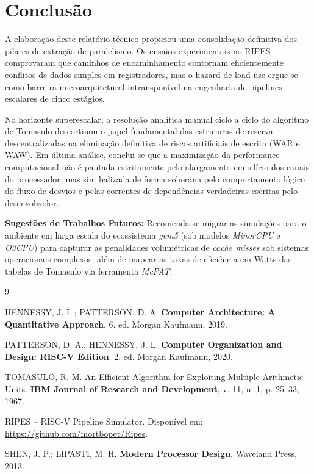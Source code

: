 \documentclass[12pt,a4paper]{article}
\begin{document}
\newpage

\section{Conclusão}
\label{sec:conclusao}

A elaboração deste relatório técnico propiciou uma consolidação definitiva dos pilares de extração de paralelismo. Os ensaios experimentais no RIPES comprovaram que caminhos de encaminhamento contornam eficientemente conflitos de dados simples em registradores, mas o hazard de load-use ergue-se como barreira microarquitetural intransponível na engenharia de pipelines escalares de cinco estágios.

No horizonte superescalar, a resolução analítica manual ciclo a ciclo do algoritmo de Tomasulo descortinou o papel fundamental das estruturas de reserva descentralizadas na eliminação definitiva de riscos artificiais de escrita (WAR e WAW). Em última análise, conclui-se que a maximização da performance computacional não é pautada estritamente pelo alargamento em silício dos canais do processador, mas sim balizada de forma soberana pelo comportamento lógico do fluxo de desvios e pelas correntes de dependências verdadeiras escritas pelo desenvolvedor.

\textbf{Sugestões de Trabalhos Futuros:} Recomenda-se migrar as simulações para o ambiente em larga escala do ecossistema \textit{gem5} (sob modelos \textit{MinorCPU} e \textit{O3CPU}) para capturar as penalidades volumétricas de \textit{cache misses} sob sistemas operacionais complexos, além de mapear as taxas de eficiência em Watts das tabelas de Tomasulo via ferramenta \textit{McPAT}.

\newpage

\begin{thebibliography}{9}

HENNESSY, J. L.; PATTERSON, D. A. \textbf{Computer Architecture: A Quantitative Approach}. 6. ed. Morgan Kaufmann, 2019.

PATTERSON, D. A.; HENNESSY, J. L. \textbf{Computer Organization and Design: RISC-V Edition}. 2. ed. Morgan Kaufmann, 2020.

TOMASULO, R. M. An Efficient Algorithm for Exploiting Multiple Arithmetic Units. \textbf{IBM Journal of Research and Development}, v. 11, n. 1, p. 25--33, 1967.

RIPES -- RISC-V Pipeline Simulator. Disponível em: \url{https://github.com/mortbopet/Ripes}.

SHEN, J. P.; LIPASTI, M. H. \textbf{Modern Processor Design}. Waveland Press, 2013.

\end{thebibliography}
\end{document}
